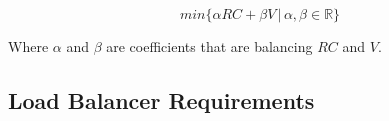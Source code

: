 \begin{equation}
    min \{ \alpha RC + \beta V \,|\, \alpha, \beta \in \mathbb{R} \}
\end{equation}

Where $\alpha$ and $\beta$ are coefficients that are balancing $RC$ and $V$.



\subsection{Load Balancer Requirements}\label{subsec:load-balancer-requirements}
